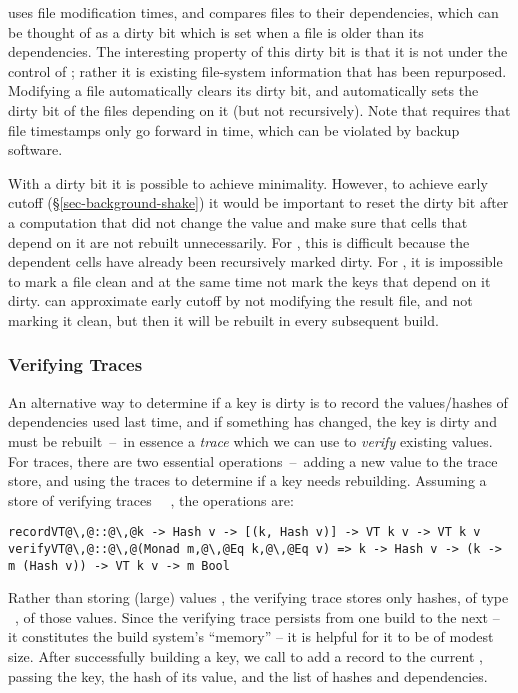\Make uses file modification times, and compares files to their dependencies,
which can be thought of as a dirty bit which is set when a file is older than
its dependencies. The interesting property of this dirty bit is that it is not
under the control of \Make; rather it is existing file-system information that
has been repurposed. Modifying a file automatically clears its dirty bit, and
automatically sets the dirty bit of the files depending on it (but not
recursively). Note that \Make requires that file timestamps only go forward in
time, which can be violated by backup software.

With a dirty bit it is possible to achieve minimality. However, to achieve early
cutoff (\S\ref{sec-background-shake}) it would be important to reset the dirty
bit after a computation that did not change the value and make sure that cells
that depend on it are not rebuilt unnecessarily. For \Excel, this is difficult
because the dependent cells have already been recursively marked dirty. For
\Make, it is impossible to mark a file clean and at the same time not mark the
keys that depend on it dirty. \Make can approximate early cutoff by not
modifying the result file, and not marking it clean, but then it will be rebuilt
in every subsequent build.

\vspace{-2mm}
\subsubsection{Verifying Traces}\label{sec-verifying-traces}

An alternative way to determine if a key is dirty is to record the
values/hashes of dependencies used last time, and if something has changed, the
key is dirty and must be rebuilt~--~in essence a \emph{trace} which we can use
to \emph{verify} existing values. For traces, there are two essential
operations~--~adding a new value to the trace store, and using the traces to
determine if a key needs rebuilding. Assuming a store of verifying traces
~~, the operations are:

\begin{verbatim}
recordVT@\,@::@\,@k -> Hash v -> [(k, Hash v)] -> VT k v -> VT k v
verifyVT@\,@::@\,@(Monad m,@\,@Eq k,@\,@Eq v) => k -> Hash v -> (k -> m (Hash v)) -> VT k v -> m Bool
\end{verbatim}

\noindent
Rather than storing (large) values , the verifying trace  stores
only hashes, of type ~, of those values. Since the verifying
trace persists from one build to the next -- it constitutes the build system's
``memory'' -- it is helpful for it to be of modest size. After successfully
building a key, we call  to add a record to the current ,
passing the key, the hash of its value, and the list of hashes and dependencies.

